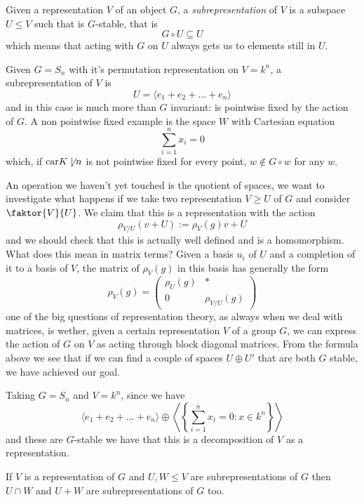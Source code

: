 \documentclass[11pt]{scrartcl}
\begin{document}
	\begin{definition}[Subrepresentation]
		Given a representation $V$ of an object $G$, a \textit{subrepresentation} of $V$ is a subspace $U\le V$ such that is $G$-stable, that is 
		$$G\circ U \subseteq U$$
		which means that acting with $G$ on $U$ always gets us to elements still in $U$.
	\end{definition}
	\begin{example}
		Given $G=S_n$ with it's permutation representation on $V=k^n$, a subrepresentation of $V$ is
		$$U=\langle e_1+e_2+\dots+e_n\rangle$$
		and in this case is much more than $G$ invariant: is pointwise fixed by the action of $G$. A non pointwise fixed example is the space $W$ with Cartesian equation
		$$\sum_{i=1}^{n}x_i=0$$
		which, if $\text{car}K \not \mid n$ is not pointwise fixed for every point, $w\not\in G\circ w$ for any $w$. 
	\end{example}
	An operation we haven't yet touched is the quotient of spaces, we want to investigate what happens if we take two representation $V\ge U$ of $G$ and consider $\faktor{V}{U}$. We claim that this is a representation with the action
	$$\rho_{V/U}(v+U):=\rho_V(g)v+U$$
	and we should check that this is actually well defined and is a homomorphism. What does this mean in matrix terms? Given a basis $u_i$ of $U$ and a completion of it to a basis of $V$, the matrix of $\rho_V(g)$ in this basis has generally the form
	$$\rho_V(g)=
	\left(
	\begin{array}{c|c}
		\rho_U(g) & * \\
		\hline
		0 & \rho_{V/U}(g)
	\end{array}
	\right)
	$$
	one of the big questions of representation theory, as always when we deal with matrices, is wether, given a certain representation $V$ of a group $G$, we can express the action of $G$ on $V$ as acting through block diagonal matrices. From the formula above we see that if we can find a couple of spaces $U\oplus U'$ that are both $G$ stable, we have achieved our goal. 
	\begin{example}
		Taking $G=S_n$ and $V=k^n$, since we have 
		$$\langle e_1+e_2+\dots+e_n \rangle \oplus \left\langle \left\{\sum_{i=1}^n x_i=0:x\in k^n\right\}\right\rangle$$
		and these are $G$-stable we have that this is a decomposition of $V$ as a representation.
	\end{example}
	\begin{remark}
		If $V$ is a representation of $G$ and $U,W\le V$ are subrepresentations of $G$ then $U\cap W$ and $U+W$ are subrepresentations of $G$ too.  
	\end{remark}
\end{document}
